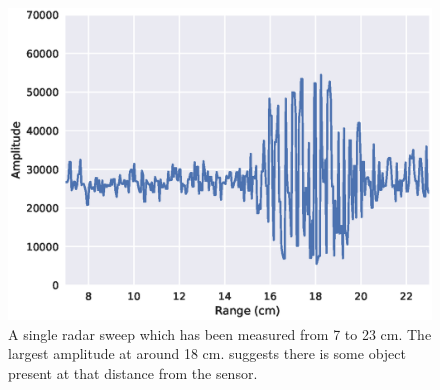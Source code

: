 \begin{figure}[h]
	\centering
	\includegraphics[scale=0.7]{figs_temp/single_sweep_raw}
	\caption{A single radar sweep which has been measured from 7 to 23 cm. The largest amplitude at around 18 cm. suggests there is some object present at that distance from the sensor.}
	\label{fig:single_sweep_raw}
\end{figure}









